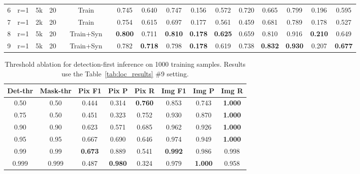 \documentclass[sigconf, screen, review, anonymous]{acmart}
\newcommand{\cmark}{\ding{51}}
\newcommand{\xmark}{\ding{55}}
\begin{document}
\begin{table}[t]
\begin{tabular}{c|lccccc|ccccc|ccccc}
        6 & r=1 & 5k & 20 & \xmark & Train & \xmark & 0.745 & 0.640 & 0.747 & 0.156 & 0.572 & 0.720 & 0.665 & 0.799 & 0.196 & 0.595 \\
        7 & r=1 & 2k & 20 & \xmark & Train & \xmark & 0.754 & 0.615 & 0.697 & 0.177 & 0.561 & 0.459 & 0.681 & 0.789 & 0.178 & 0.527 \\
        8 & r=1 & 5k & 20 & \xmark & Train+Syn & \xmark & \textbf{0.800} & 0.711 & \textbf{0.810} & \textbf{0.178} & \textbf{0.625} & 0.659 & 0.810 & 0.916 & \textbf{0.210} & 0.649 \\
        9 & r=1 & 5k & 20 & \xmark & Train+Syn & \cmark & 0.782 & \textbf{0.718} & 0.798 & \textbf{0.178} & 0.619 & 0.738 & \textbf{0.832} & \textbf{0.930} & 0.207 & \textbf{0.677} \\
        \bottomrule
    \end{tabular}%
\end{table}

\begin{table}[t]
    \caption{Threshold ablation for detection-first inference on 1000 training samples. Results use the Table~\ref{tab:loc_results} \#9 setting.}
    \label{tab:det_results}
    \centering
    \small
    \setlength{\tabcolsep}{4pt}
    \begin{tabular}{cc|cccccc}
        \toprule
        Det-thr & Mask-thr & Pix F1 & Pix P & Pix R & Img F1 & Img P & Img R \\
        \midrule
        0.50 & 0.50 & 0.444 & 0.314 & \textbf{0.760} & 0.853 & 0.743 & \textbf{1.000} \\
        0.75 & 0.50 & 0.451 & 0.323 & 0.752 & 0.930 & 0.870 & \textbf{1.000} \\
        0.90 & 0.90 & 0.623 & 0.571 & 0.685 & 0.962 & 0.926 & \textbf{1.000} \\
        0.95 & 0.95 & 0.667 & 0.690 & 0.646 & 0.974 & 0.949 & \textbf{1.000} \\
        0.99 & 0.99 & \textbf{0.673} & 0.889 & 0.541 & \textbf{0.992} & 0.986 & 0.998 \\
        0.999 & 0.999 & 0.487 & \textbf{0.980} & 0.324 & 0.979 & \textbf{1.000} & 0.958 \\
        \bottomrule
    \end{tabular}%
\end{table}
\end{document}
